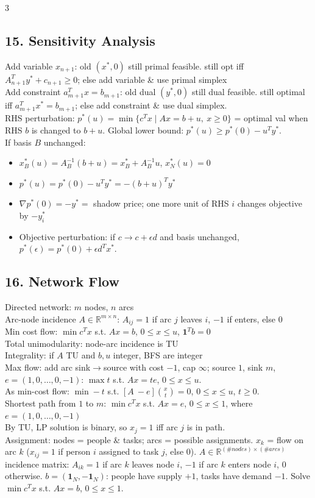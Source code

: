 \documentclass[8pt,landscape]{extarticle}
\newcommand{\R}{\mathbb{R}}
\newcommand{\1}{\mathbf{1}}
\newcommand{\0}{\mathbf{0}}
\begin{document}
\begin{multicols*}{3}
\subsection*{15. Sensitivity Analysis}
Add variable $x_{n+1}$: old $(x^*,0)$ still primal feasible.
still opt iff $A_{n+1}^Ty^*+c_{n+1}\ge0$; else add variable \& use primal simplex \\
Add constraint $a_{m+1}^Tx=b_{m+1}$: old dual $(y^*,0)$ still dual feasible. still optimal iff $a_{m+1}^Tx^*=b_{m+1}$; else add constraint \& use dual simplex. \\
RHS perturbation: $p^*(u)=\min\{c^Tx\mid Ax=b+u,\ x\ge0\}$ = optimal val when RHS $b$ is changed to $b+u$.
Global lower bound: $p^*(u)\ge p^*(0)-u^Ty^*$. \\
If basis $B$ unchanged:
\begin{itemize}
  \item $x_B^*(u)=A_B^{-1}(b+u)=x_B^*+A_B^{-1}u$, $x_N^*(u)=0$
  \item $p^*(u)=p^*(0)-u^Ty^*=-(b+u)^Ty^*$
  \item $\nabla p^*(0)=-y^* = $ shadow price; one more unit of RHS $i$ changes objective by $-y_i^*$
  \item Objective perturbation: if $c\to c+\epsilon d$ and basis unchanged,
$p^*(\epsilon)=p^*(0)+\epsilon d^Tx^*$.
\end{itemize}


\subsection*{16. Network Flow}
Directed network: $m$ nodes, $n$ arcs \\
Arc-node incidence $A\in\R^{m\times n}$: $A_{ij}=1$ if arc $j$ leaves $i$, $-1$ if enters, else $0$ \\
Min cost flow: $\min c^Tx$ s.t. $Ax=b$, $0\le x\le u$, $\1^Tb=0$ \\
Total unimodularity: node-arc incidence is TU \\
Integrality: if $A$ TU and $b,u$ integer, BFS are integer \\
Max flow: add arc sink$\to$source with cost $-1$, cap $\infty$; source $1$, sink $m$, $e=(1,0,\ldots,0,-1)$:
$\max t$ s.t. $Ax=te$, $0\le x\le u$. \\
As min-cost flow: $\min -t$ s.t. $[A\ -e]\binom{x}{t}=0$, $0\le x\le u$, $t\ge0$.\\
Shortest path from $1$ to $m$: $\min c^Tx$ s.t. $Ax=e$, $0\le x\le1$,
where $e=(1,0,\ldots,0,-1)$\\
By TU, LP solution is binary, so $x_j=1$ iff arc $j$ is in path.\\
Assignment: nodes = people \& tasks; arcs = possible assignments.
$x_k$ = flow on arc $k$ ($x_{ij}=1$ if person $i$ assigned to task $j$, else $0$). 
$A\in\R^{(\#nodes)\times(\#arcs)}$ incidence matrix:
$A_{ik}=1$ if arc $k$ leaves node $i$, $-1$ if arc $k$ enters node $i$, $0$ otherwise.
$b=(\1_N,-\1_N)$: people have supply $+1$, tasks have demand $-1$.
Solve $\min c^Tx$ s.t. $Ax=b$, $0\le x\le1$.



\end{multicols*}
\end{document}
